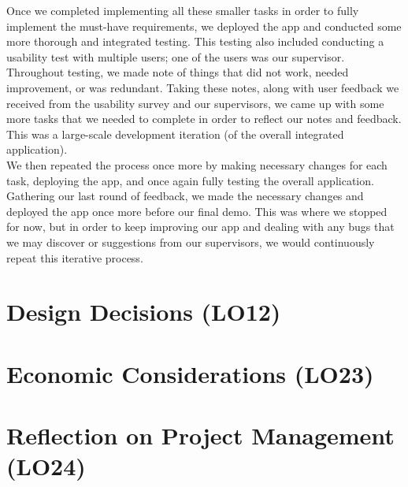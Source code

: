 \documentclass{article}
\begin{document}
Once we completed implementing all these smaller tasks in order to fully implement the must-have 
requirements, we deployed the app and conducted some more thorough and integrated testing. This testing 
also included conducting a usability test with multiple users; one of the users was our supervisor. 
Throughout testing, we made note of things that did not work, needed improvement, or was redundant. 
Taking these notes, along with user feedback we received from the usability survey and our supervisors, 
we came up with some more tasks that we needed to complete in order to reflect our notes and feedback. 
This was a large-scale development iteration (of the overall integrated application).\\

We then repeated the process once more by making necessary changes for each task, deploying the app, 
and once again fully testing the overall application. Gathering our last round of feedback, we made 
the necessary changes and deployed the app once more before our final demo. This was where we stopped 
for now, but in order to keep improving our app and dealing with any bugs that we may discover or 
suggestions from our supervisors, we would continuously repeat this iterative process.

\section{Design Decisions (LO12)}


\section{Economic Considerations (LO23)}


\section{Reflection on Project Management (LO24)}
\end{document}
